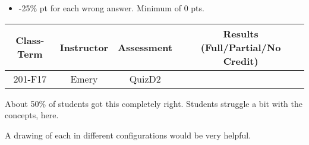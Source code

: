 \begin{rubric}

\begin{itemize}
	\item -25\% pt for each wrong answer. Minimum of 0 pts.
\end{itemize}

\end{rubric}



\begin{outcomes}
	\begin{center}
		\begin{tabular}{cccc}
			\hline\hline
                Class-Term & Instructor & Assessment & Results (Full/Partial/No Credit) \\
			\hline
                201-F17 & Emery & QuizD2 &  \\
			\hline
		\end{tabular}
	\end{center}
	
About 50\% of students got this completely right. Students struggle a bit with the concepts, here.

A drawing of each in different configurations would be very helpful.
\end{outcomes}

\begin{comments}

\end{comments}